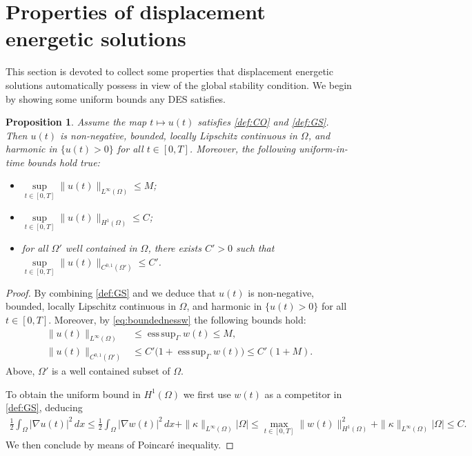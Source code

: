 \documentclass[a4paper,11pt,reqno]{amsart}
\numberwithin{equation}{section}
\newtheorem{prop}[teo]{Proposition}
\theoremstyle{definition}
\theoremstyle{remark}
\DeclareMathOperator*{\esssup}{ess\, sup}
\begin{document}
\section{Properties of displacement energetic solutions}\label{sec:properties}

This section is devoted to collect some properties that displacement energetic solutions automatically possess in view of the global stability condition. We begin by showing some uniform bounds any DES satisfies.
\begin{prop}\label{prop:boundDES}
    Assume the map $t\mapsto u(t)$ satisfies \ref{def:CO} and \ref{def:GS}. Then $u(t)$ is non-negative, bounded, locally Lipschitz continuous in $\Omega$, and harmonic in $\{u(t)>0\}$ for all $t\in [0,T]$. Moreover, the following uniform-in-time bounds hold true:
    \begin{itemize}
        \item $\sup\limits_{t\in [0,T]}\|u(t)\|_{L^\infty(\Omega)}\le M$;
        \item $\sup\limits_{t\in [0,T]}\|u(t)\|_{H^1(\Omega)}\le C$;
        \item for all $\Omega'$ well contained in $\Omega$, there exists $C'>0$ such that $\sup\limits_{t\in [0,T]}\|u(t)\|_{C^{0,1}(\Omega')}\le C'$.
    \end{itemize}
    
\end{prop}
\begin{proof}
    By combining \ref{def:GS} and  we deduce that $u(t)$ is non-negative, bounded, locally Lipschitz continuous in $\Omega$, and harmonic in $\{u(t)>0\}$ for all $t\in [0,T]$. Moreover, by \eqref{eq:boundednessw} the following bounds hold:
    \begin{align}
        \|u(t)\|_{L^\infty(\Omega)}&\le\esssup_\Gamma w(t)\le M,\\
        \|u(t)\|_{C^{0,1}(\Omega')}&\le C'\Big(1+\esssup_\Gamma w(t)\Big)\le C'(1+M).
    \end{align}
    Above, $\Omega'$ is a well contained subset of $\Omega$.

    To obtain the uniform bound in $H^1(\Omega)$ we first use $w(t)$ as a competitor in \ref{def:GS}, deducing
    \begin{align}
        \frac 12\int_\Omega|\nabla u(t)|^2 \,dx\le \frac 12\int_\Omega|\nabla w(t)|^2 \,dx +\|\kappa\|_{L^\infty(\Omega)}|\Omega|\le \max\limits_{t\in [0,T]}\|w(t)\|^2_{H^1(\Omega)}+\|\kappa\|_{L^\infty(\Omega)}|\Omega|\le C.
    \end{align}
    We then conclude by means of Poincar\'e inequality.
\end{proof}
\end{document}
